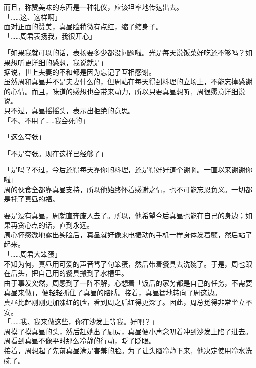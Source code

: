 而且，称赞美味的东西是一种礼仪，应该坦率地传达出去。\\

「……这、这样啊」\\

面对正面的赞美，真昼脸稍微有点红，缩了缩身子。\\

「……周君表扬我，我很开心」

「如果我就可以的话，表扬要多少都没问题啦。光是每天说饭菜好吃还不够吗？如果想听更详细的感想，我说就是」\\

据说，世上夫妻的不和都是因为忘记了互相感谢。\\

虽然周和真昼并不是夫妻什么的，但周站在每天得到料理的立场上，不能忘掉感谢的心情。而且，味道的感想也会带来动力，所以只要真昼想听，周很愿意详细说说。\\

只不过，真昼摇摇头，表示出拒绝的意思。\\

「不、不用了……我会死的」

「这么夸张」

「不是夸张。现在这样已经够了」

「是吗？不过，今后还得每天靠你的料理，还是得好好道个谢啊。一直以来谢谢你啦」\\

周的伙食全都靠真昼支持，所以他始终怀着感谢之情，也不可能忘恩负义。一切都是托了真昼的福。

要是没有真昼，周就直奔废人去了。所以，他希望今后真昼也能在自己的身边；如果再贪心点的话，直到永远。\\

周心怀感激地露出笑脸后，真昼就好像来电振动的手机一样身体发着颤，然后站了起来。\\

「……周君大笨蛋」\\

不知为何，真昼用可爱的声音骂了句笨蛋，然后带着餐具去洗碗了。于是，周也跟在后头，把自己用的餐具搬到了水槽里。\\

由于事发突然，周感到了一阵不解，心想着「饭后的家务都是自己的任务，不需要真昼来做」，便轻轻抓住了真昼的胳膊。接着，真昼猛地转向了周这边。\\

真昼比起刚刚更加涨红的脸，看到周之后红得更深了。因此，周总觉得非常坐立不安。\\

「……我、我来做这些，你在沙发上等我。好吧？」\\

周摸了摸真昼的头，然后赶她出了厨房，真昼便小声念叨着冲到沙发上陷了进去。\\

周看到真昼不像平时那么冷静的行动，眨了眨眼。\\

接着，周想起了先前真昼满是害羞的脸。为了让头脑冷静下来，他决定使用冷水洗碗了。
